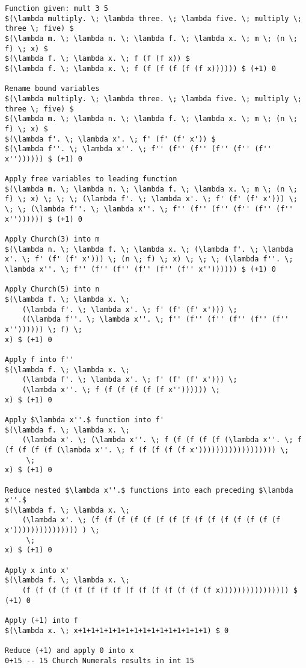 \documentclass{article}
\begin{document}
        \begin{lstlisting}
Function given: mult 3 5
$(\lambda multiply. \; \lambda three. \; \lambda five. \; multiply \; three \; five) $
$(\lambda m. \; \lambda n. \; \lambda f. \; \lambda x. \; m \; (n \; f) \; x) $
$(\lambda f. \; \lambda x. \; f (f (f x)) $
$(\lambda f. \; \lambda x. \; f (f (f (f (f (f x)))))) $ (+1) 0

Rename bound variables
$(\lambda multiply. \; \lambda three. \; \lambda five. \; multiply \; three \; five) $
$(\lambda m. \; \lambda n. \; \lambda f. \; \lambda x. \; m \; (n \; f) \; x) $
$(\lambda f'. \; \lambda x'. \; f' (f' (f' x')) $
$(\lambda f''. \; \lambda x''. \; f'' (f'' (f'' (f'' (f'' (f'' x'')))))) $ (+1) 0

Apply free variables to leading function
$(\lambda m. \; \lambda n. \; \lambda f. \; \lambda x. \; m \; (n \; f) \; x) \; \; \; (\lambda f'. \; \lambda x'. \; f' (f' (f' x'))) \; \; \; (\lambda f''. \; \lambda x''. \; f'' (f'' (f'' (f'' (f'' (f'' x'')))))) $ (+1) 0

Apply Church(3) into m
$(\lambda n. \; \lambda f. \; \lambda x. \; (\lambda f'. \; \lambda x'. \; f' (f' (f' x'))) \; (n \; f) \; x) \; \; \; (\lambda f''. \; \lambda x''. \; f'' (f'' (f'' (f'' (f'' (f'' x'')))))) $ (+1) 0

Apply Church(5) into n
$(\lambda f. \; \lambda x. \; 
    (\lambda f'. \; \lambda x'. \; f' (f' (f' x'))) \;
    ((\lambda f''. \; \lambda x''. \; f'' (f'' (f'' (f'' (f'' (f'' x'')))))) \; f) \; 
x) $ (+1) 0

Apply f into f''
$(\lambda f. \; \lambda x. \; 
    (\lambda f'. \; \lambda x'. \; f' (f' (f' x'))) \;
    (\lambda x''. \; f (f (f (f (f (f x'')))))) \; 
x) $ (+1) 0

Apply $\lambda x''.$ function into f'
$(\lambda f. \; \lambda x. \; 
    (\lambda x'. \; (\lambda x''. \; f (f (f (f (f (\lambda x''. \; f (f (f (f (f (\lambda x''. \; f (f (f (f (f x')))))))))))))))))) \;
     \; 
x) $ (+1) 0

Reduce nested $\lambda x''.$ functions into each preceding $\lambda x''.$
$(\lambda f. \; \lambda x. \; 
    (\lambda x'. \; (f (f (f (f (f (f (f (f (f (f (f (f (f (f (f x'))))))))))))))) ) \;
     \; 
x) $ (+1) 0

Apply x into x'
$(\lambda f. \; \lambda x. \; 
    (f (f (f (f (f (f (f (f (f (f (f (f (f (f (f x)))))))))))))))) $  (+1) 0

Apply (+1) into f
$(\lambda x. \; x+1+1+1+1+1+1+1+1+1+1+1+1+1+1+1) $ 0

Reduce (+1) and apply 0 into x
0+15 -- 15 Church Numerals results in int 15
            
        \end{lstlisting}
            
\end{document}
